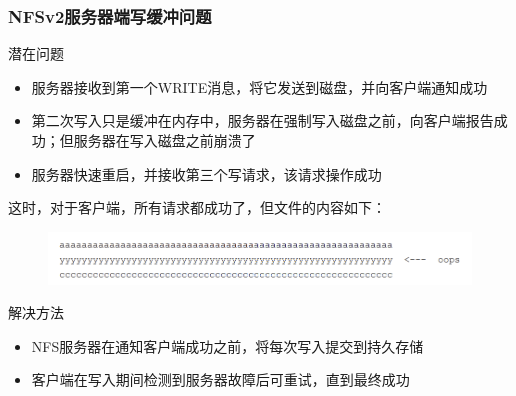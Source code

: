 \begin{frame}[fragile]
    \frametitle{NFSv2服务器端写缓冲问题}
    潜在问题
    \begin{itemize}
        \item 服务器接收到第一个WRITE消息，将它发送到磁盘，并向客户端通知成功
        \item 第二次写入只是缓冲在内存中，服务器在强制写入磁盘之前，向客户端报告成功；但服务器在写入磁盘之前崩溃了
        \item 服务器快速重启，并接收第三个写请求，该请求操作成功
    \end{itemize}
    
    这时，对于客户端，所有请求都成功了，但文件的内容如下：
    
    \begin{figure}
        \includegraphics[width=0.8\linewidth]{figs/nfsv2-srv2.png}
    \end{figure} \pause
    
    解决方法
    \begin{itemize}
        \item NFS服务器在通知客户端成功之前，将每次写入提交到持久存储
        \item 客户端在写入期间检测到服务器故障后可重试，直到最终成功
    \end{itemize}
\end{frame}

